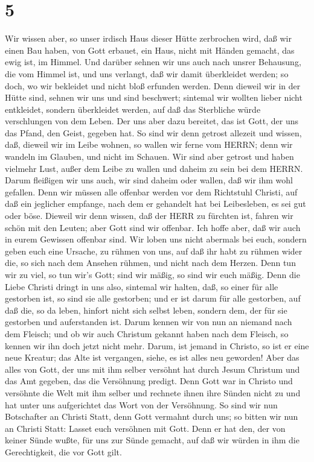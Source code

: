 \hypertarget{section-4}{%
\section{5}\label{section-4}}

 Wir wissen aber, so unser irdisch Haus dieser Hütte
zerbrochen wird, daß wir einen Bau haben, von Gott erbauet, ein Haus,
nicht mit Händen gemacht, das ewig ist, im Himmel.  Und
darüber sehnen wir uns auch nach unsrer Behausung, die vom Himmel ist,
und uns verlangt, daß wir damit überkleidet werden;  so
doch, wo wir bekleidet und nicht bloß erfunden werden.  Denn
dieweil wir in der Hütte sind, sehnen wir uns und sind beschwert;
sintemal wir wollten lieber nicht entkleidet, sondern überkleidet
werden, auf daß das Sterbliche würde verschlungen von dem Leben.
 Der uns aber dazu bereitet, das ist Gott, der uns das
Pfand, den Geist, gegeben hat.  So sind wir denn getrost
allezeit und wissen, daß, dieweil wir im Leibe wohnen, so wallen wir
ferne vom HERRN;  denn wir wandeln im Glauben, und nicht im
Schauen.  Wir sind aber getrost und haben vielmehr Lust,
außer dem Leibe zu wallen und daheim zu sein bei dem HERRN. 
Darum fleißigen wir uns auch, wir sind daheim oder wallen, daß wir ihm
wohl gefallen.  Denn wir müssen alle offenbar werden vor
dem Richtstuhl Christi, auf daß ein jeglicher empfange, nach dem er
gehandelt hat bei Leibesleben, es sei gut oder böse. 
Dieweil wir denn wissen, daß der HERR zu fürchten ist, fahren wir schön
mit den Leuten; aber Gott sind wir offenbar. Ich hoffe aber, daß wir
auch in eurem Gewissen offenbar sind.  Wir loben uns nicht
abermals bei euch, sondern geben euch eine Ursache, zu rühmen von uns,
auf daß ihr habt zu rühmen wider die, so sich nach dem Ansehen rühmen,
und nicht nach dem Herzen.  Denn tun wir zu viel, so tun
wir's Gott; sind wir mäßig, so sind wir euch mäßig.  Denn
die Liebe Christi dringt in uns also, sintemal wir halten, daß, so einer
für alle gestorben ist, so sind sie alle gestorben;  und er
ist darum für alle gestorben, auf daß die, so da leben, hinfort nicht
sich selbst leben, sondern dem, der für sie gestorben und auferstanden
ist.  Darum kennen wir von nun an niemand nach dem Fleisch;
und ob wir auch Christum gekannt haben nach dem Fleisch, so kennen wir
ihn doch jetzt nicht mehr.  Darum, ist jemand in Christo,
so ist er eine neue Kreatur; das Alte ist vergangen, siehe, es ist alles
neu geworden!  Aber das alles von Gott, der uns mit ihm
selber versöhnt hat durch Jesum Christum und das Amt gegeben, das die
Versöhnung predigt.  Denn Gott war in Christo und versöhnte
die Welt mit ihm selber und rechnete ihnen ihre Sünden nicht zu und hat
unter uns aufgerichtet das Wort von der Versöhnung.  So
sind wir nun Botschafter an Christi Statt, denn Gott vermahnt durch uns;
so bitten wir nun an Christi Statt: Lasset euch versöhnen mit Gott.
 Denn er hat den, der von keiner Sünde wußte, für uns zur
Sünde gemacht, auf daß wir würden in ihm die Gerechtigkeit, die vor Gott
gilt.


